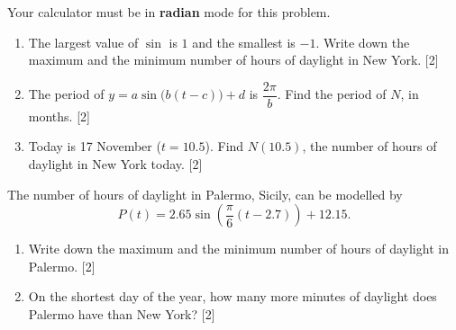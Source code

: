 \documentclass[12pt, twoside]{article}
\begin{document}
\begin{enumerate}[itemsep=0.15cm]
Your calculator must be in \textbf{radian} mode for this problem.

\begin{enumerate}[itemsep=0.1cm]
  \item The largest value of $\sin$ is $1$ and the smallest is $-1$. Write
  down the maximum and the minimum number of hours of daylight in New York.
  \hfill [2]
  \item The period of $y = a\sin\bigl(b(t - c)\bigr) + d$ is
  $\dfrac{2\pi}{b}$. Find the period of $N$, in months. \hfill [2]
  \item Today is 17 November ($t = 10.5$). Find $N(10.5)$, the number of
  hours of daylight in New York today. \hfill [2]
\end{enumerate}

The number of hours of daylight in Palermo, Sicily, can be modelled by
\[
  P(t) = 2.65\sin\left(\frac{\pi}{6}(t - 2.7)\right) + 12.15.
\]

\begin{enumerate}[itemsep=0.1cm]
  \item[(d)] Write down the maximum and the minimum number of hours of
  daylight in Palermo. \hfill [2]
  \item[(e)] On the shortest day of the year, how many more minutes of
  daylight does Palermo have than New York? \hfill [2]
\end{enumerate}


\end{enumerate}
\end{document}
